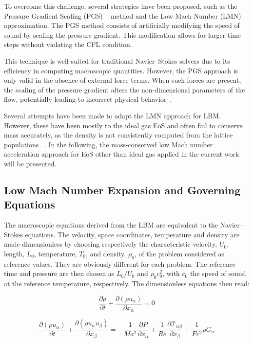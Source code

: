 To overcome this challenge, several strategies have been proposed, such as the
Pressure Gradient Scaling (PGS) ~\cite{ramshaw1985pressure} method and the Low
Mach Number (LMN) approximation. The PGS method consists of artificially
modifying the speed of sound by scaling the pressure gradient. This modification
allows for larger time steps without violating the CFL condition.

This technique is well-suited for traditional Navier–Stokes solvers due to its
efficiency in computing macroscopic quantities. However, the PGS approach is
only valid in the absence of external force terms. When such forces are present,
the scaling of the pressure gradient alters the non-dimensional parameters of
the flow, potentially leading to incorrect physical
behavior~\cite{wang2004artificial}.

Several attempts have been made to adapt the LMN approach for LBM. However,
these have been mostly  to the ideal gas EoS and often fail to conserve mass
accurately, as the density is not consistently computed from the lattice
populations ~\cite{wang2022new, hosseini2023low}. In the following, the
mass-conserved low Mach number acceleration approach for EoS other than ideal
gas applied in the current work will be presented.

\subsection{Low Mach Number Expansion and Governing Equations}

The macroscopic equations derived from the LBM are equivalent to the
Navier–Stokes equations. The velocity, space coordinates, temperature and
density are made dimensionless by choosing respectively the characteristic
velocity, $U_0$, length, $L_0$, temperature, $T_0$, and density, $\rho_0$, of
the problem considered as reference values. They are obviously different for
each problem. The reference time and pressure are then chosen as $L_0/U_0$ and
$\rho_0 c_0^2$, with $c_0$ the speed of sound at the reference temperature,
respectively. The dimensionless equations then read:

\begin{equation}
    \frac{\partial \rho}{\partial t} + \frac{\partial (\rho u_\alpha)}{\partial x_\alpha}  = 0
\end{equation}

\begin{equation}
    \frac{\partial (\rho u_\alpha)}{\partial t}  + \frac{\partial (\rho u_\alpha u_\beta)}{\partial x_\beta} = -\frac{1}{M\!a^2} \frac{\partial P}{\partial x_\alpha } + \frac{1}{Re} \frac{\partial \mathcal{T}_{\alpha\beta}}{\partial x_\beta} + \frac{1}{Fr^2} \rho G_\alpha
\end{equation}

